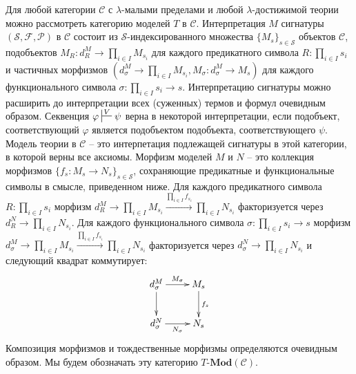 \documentclass[reqno]{amsart}
\theoremstyle{definition}
\theoremstyle{remark}
\newcommand{\bcat}[1]{\mathbf{#1}}
\newcommand{\cat}[1]{\mathcal{#1}}
\newcommand{\Mod}[1]{#1\text{-}\bcat{Mod}}
\begin{document}
Для любой категории $\cat{C}$ с $\lambda$-малыми пределами и любой $\lambda$-достижимой теории можно рассмотреть категорию моделей $T$ в $\cat{C}$.
Интерпретация $M$ сигнатуры $(\mathcal{S},\mathcal{F},\mathcal{P})$ в $\cat{C}$ состоит из $\mathcal{S}$-индексированного множества $\{ M_s \}_{s \in \mathcal{S}}$ объектов $\cat{C}$,
подобъектов $M_R : d^M_R \to \prod_{i \in I} M_{s_i}$ для каждого предикатного символа $R : \prod_{i \in I} s_i$
и частичных морфизмов $(d^M_\sigma \to \prod_{i \in I} M_{s_i}, M_\sigma : d^M_\sigma \to M_s)$ для каждого функционального символа $\sigma : \prod_{i \in I} s_i \to s$.
Интерпретацию сигнатуры можно расширить до интерпретации всех (суженных) термов и формул очевидным образом.
Секвенция $\varphi \sststile{}{V} \psi$ верна в некоторой интерпретации, если подобъект, соответствующий $\varphi$ является подобъектом подобъекта, соответствующего $\psi$.
Модель теории в $\cat{C}$ -- это интерпетация подлежащей сигнатуры в этой категории, в которой верны все аксиомы.
Морфизм моделей $M$ и $N$ -- это коллекция морфизмов $\{ f_s : M_s \to N_s \}_{s \in \mathcal{S}}$, сохраняющие предикатные и функциональные символы в смысле, приведенном ниже.
Для каждого предикатного символа $R : \prod_{i \in I} s_i$ морфизм $d^M_R \to \prod_{i \in I} M_{s_i} \xrightarrow{\prod_{i \in I} f_{s_i}} \prod_{i \in I} N_{s_i}$ факторизуется через $d^N_R \to \prod_{i \in I} N_{s_i}$.
Для каждого функционального символа $\sigma : \prod_{i \in I} s_i \to s$ морфизм $d^M_\sigma \to \prod_{i \in I} M_{s_i} \xrightarrow{\prod_{i \in I} f_{s_i}} \prod_{i \in I} N_{s_i}$
факторизуется через $d^N_\sigma \to \prod_{i \in I} N_{s_i}$ и следующий квадрат коммутирует:
\[ \xymatrix{ d^M_\sigma \ar[r]^{M_\sigma} \ar[d] & M_s \ar[d]^{f_s} \\
              d^N_\sigma \ar[r]_{N_\sigma}        & N_s
            } \]
Композиция морфизмов и тождественные морфизмы определяются очевидным образом.
Мы будем обозначать эту категорию $\Mod{T}(\cat{C})$.
\end{document}
